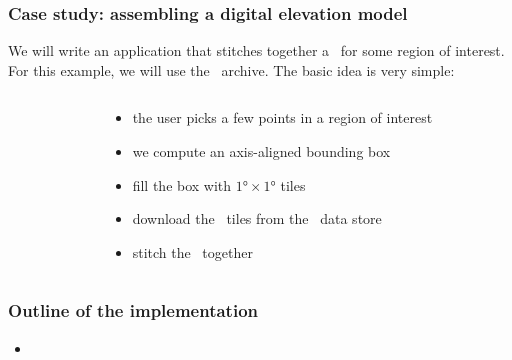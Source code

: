 \begin{frame}[t]
  \frametitle{Case study: assembling a digital elevation model}
%
  We will write an application that stitches together a \dem\ for some region of interest. For
  this example, we will use the \srtm\ archive. The basic idea is very simple:

%
  \begin{columns}
    \begin{column}{.4\textwidth}
    \end{column}
    \begin{column}{.5\textwidth}
      \begin{itemize}
      \item<2-> the user picks a few points in a region of interest
      \item<3-> we compute an axis-aligned bounding box
      \item<4-> fill the box with $1\si{\degree} \times 1\si{\degree}$ tiles
      \item<5-> download the \dem\ tiles from the \srtm\ data store
      \item<6-> stitch the \dem\ together
      \end{itemize}
    \end{column}
  \end{columns}


%
\end{frame}

\begin{frame}
%
  \frametitle{Outline of the implementation}
%
%
  \begin{itemize}
%
  \item
%
  \end{itemize}
%
\end{frame}



